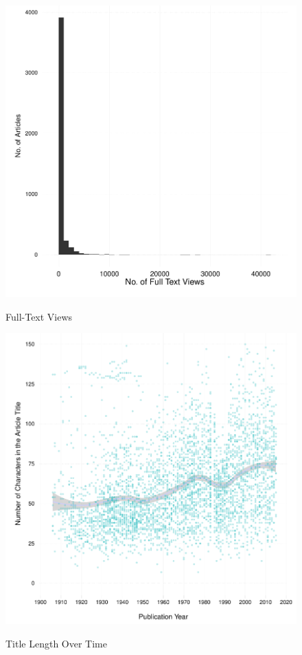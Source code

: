 \documentclass[11pt]{article}
\begin{document}
\begin{figure}[htbp]
\centering
\caption{Full-Text Views}
\includegraphics[scale=.85]{../figs/fulltext_views.pdf}
\label{fig:fulltext}
\end{figure}

\begin{figure}[htbp]
\centering
\caption{Title Length Over Time}
\includegraphics[scale=.85]{../figs/title_len_over_time.pdf}
\label{fig:fulltext}
\end{figure}

\clearpage


\end{document}
